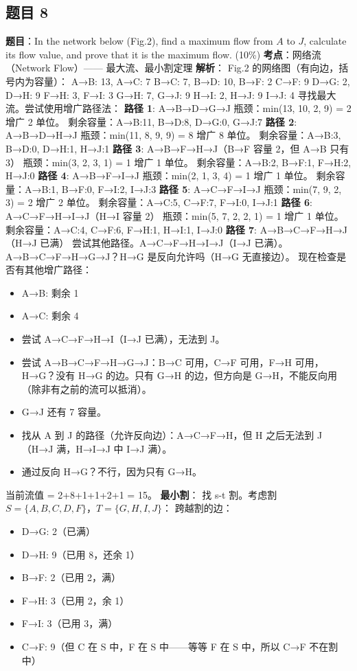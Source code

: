 \documentclass[10pt,a4paper,openany]{ctexbook}
\theoremstyle{definition}
\theoremstyle{remark}
\begin{document}
\subsection{题目 8}

\textbf{题目}：In the network below (Fig.2), find a maximum flow from $A$ to $J$, calculate its flow value, and prove that it is the maximum flow. (10\%)
\textbf{考点}：网络流（Network Flow）—— 最大流、最小割定理
\textbf{解析}：
Fig.2 的网络图（有向边，括号内为容量）：
A→B: 13, A→C: 7
B→C: 7, B→D: 10, B→F: 2
C→F: 9
D→G: 2, D→H: 9
F→H: 3, F→I: 3
G→H: 7, G→J: 9
H→I: 2, H→J: 9
I→J: 4
寻找最大流。尝试使用增广路径法：
\textbf{路径 1}: A→B→D→G→J
瓶颈：min(13, 10, 2, 9) = 2
增广 2 单位。
剩余容量：A→B:11, B→D:8, D→G:0, G→J:7
\textbf{路径 2}: A→B→D→H→J
瓶颈：min(11, 8, 9, 9) = 8
增广 8 单位。
剩余容量：A→B:3, B→D:0, D→H:1, H→J:1
\textbf{路径 3}: A→B→F→H→J（B→F 容量 2，但 A→B 只有 3）
瓶颈：min(3, 2, 3, 1) = 1
增广 1 单位。
剩余容量：A→B:2, B→F:1, F→H:2, H→J:0
\textbf{路径 4}: A→B→F→I→J
瓶颈：min(2, 1, 3, 4) = 1
增广 1 单位。
剩余容量：A→B:1, B→F:0, F→I:2, I→J:3
\textbf{路径 5}: A→C→F→I→J
瓶颈：min(7, 9, 2, 3) = 2
增广 2 单位。
剩余容量：A→C:5, C→F:7, F→I:0, I→J:1
\textbf{路径 6}: A→C→F→H→I→J（H→I 容量 2）
瓶颈：min(5, 7, 2, 2, 1) = 1
增广 1 单位。
剩余容量：A→C:4, C→F:6, F→H:1, H→I:1, I→J:0
\textbf{路径 7}: A→B→C→F→H→J（H→J 已满）
尝试其他路径。A→C→F→H→I→J（I→J 已满）。
A→B→C→F→H→G→J？H→G 是反向允许吗（H→G 无直接边）。
现在检查是否有其他增广路径：
\begin{itemize}
\item A→B: 剩余 1
\item A→C: 剩余 4
\item 尝试 A→C→F→H→I（I→J 已满），无法到 J。
\item 尝试 A→B→C→F→H→G→J：B→C 可用，C→F 可用，F→H 可用，H→G？没有 H→G 的边。只有 G→H 的边，但方向是 G→H，不能反向用（除非有之前的流可以抵消）。
\item G→J 还有 7 容量。
\item 找从 A 到 J 的路径（允许反向边）：A→C→F→H，但 H 之后无法到 J（H→J 满，H→I→J 中 I→J 满）。
\item 通过反向 H→G？不行，因为只有 G→H。

\end{itemize}

当前流值 = 2+8+1+1+2+1 = 15。
\textbf{最小割}：
找 s-t 割。考虑割 $S = \{A, B, C, D, F\}$，$T = \{G, H, I, J\}$：
跨越割的边：
\begin{itemize}
\item D→G: 2（已满）
\item D→H: 9（已用 8，还余 1）
\item B→F: 2（已用 2，满）
\item F→H: 3（已用 2，余 1）
\item F→I: 3（已用 3，满）
\item C→F: 9（但 C 在 S 中，F 在 S 中——等等 F 在 S 中，所以 C→F 不在割中）

\end{itemize}
\end{document}
